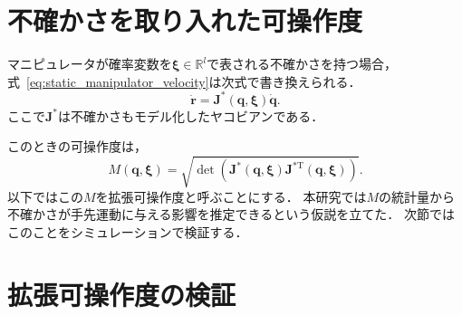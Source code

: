 \documentclass[10pt,a4j,twocolumn]{ltjsarticle}
\begin{document}
\section{不確かさを取り入れた可操作度}

マニピュレータが確率変数を$\bm{\xi} \in \mathbb{R}^{l}$で表される不確かさを持つ場合，式~\eqref{eq:static_manipulator_velocity}は次式で書き換えられる．
\begin{equation}
  \dot{\bm{r}} = \bm{J}^{*}(\bm{q}, \bm{\xi}) \dot{\bm{q}}. \label{eq:static_manipulator_velocity_with_uncertainty}
\end{equation}
ここで$\bm{J}^{*}$は不確かさもモデル化したヤコビアンである．

このときの可操作度は，
\begin{equation}
  M(\bm{q}, \bm{\xi}) = \sqrt{\det \left( \bm{J}^{*}(\bm{q}, \bm{\xi}) \bm{J}^{*\mathrm{T}}(\bm{q}, \bm{\xi}) \right)}.
\end{equation}
以下ではこの$M$を拡張可操作度と呼ぶことにする．
本研究では$M$の統計量から不確かさが手先運動に与える影響を推定できるという仮説を立てた．
次節ではこのことをシミュレーションで検証する．

\section{拡張可操作度の検証}
\end{document}

